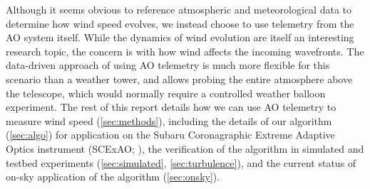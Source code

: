 Although it seems obvious to reference atmospheric and meteorological data to determine how wind speed evolves, we instead choose to use telemetry from the AO system itself. While the dynamics of wind evolution are itself an interesting research topic, the concern is with how wind affects the incoming wavefronts. The data-driven approach of using AO telemetry is much more flexible for this scenario than a weather tower, and allows probing the entire atmosphere above the telescope, which would normally require a controlled weather balloon experiment. The rest of this report details how we can use AO telemetry to measure wind speed (\autoref{sec:methods}), including the details of our algorithm (\autoref{sec:algo}) for application on the Subaru Coronagraphic Extreme Adaptive Optics instrument (SCExAO; \citealp{guyon_wavefront_2011}), the verification of the algorithm in simulated and testbed experiments (\autoref{sec:simulated}, \autoref{sec:turbulence}), and the current status of on-sky application of the algorithm (\autoref{sec:onsky}).
